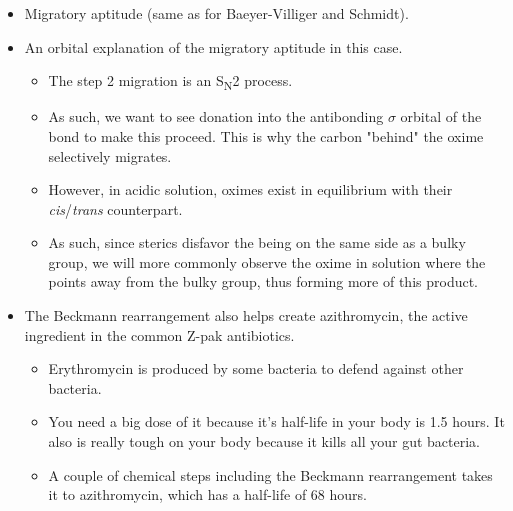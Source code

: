 \documentclass[../notes.tex]{subfiles}
\begin{document}
\begin{itemize}
    \item Migratory aptitude (same as for Baeyer-Villiger and Schmidt).
    \item An orbital explanation of the migratory aptitude in this case.
    \begin{itemize}
        \item The step 2 migration is an S\textsubscript{N}2 process.
        \item As such, we want to see donation into the antibonding $\sigma$ orbital of the  bond to make this proceed. This is why the carbon "behind" the oxime selectively migrates.
        \item However, in acidic solution, oximes exist in equilibrium with their \emph{cis}/\emph{trans} counterpart.
        \item As such, since sterics disfavor the  being on the same side as a bulky group, we will more commonly observe the oxime in solution where the  points away from the bulky group, thus forming more of this product.
    \end{itemize}
    \item The Beckmann rearrangement also helps create azithromycin, the active ingredient in the common Z-pak antibiotics.
    \begin{itemize}
        \item Erythromycin is produced by some bacteria to defend against other bacteria.
        \item You need a big dose of it because it's half-life in your body is 1.5 hours. It also is really tough on your body because it kills all your gut bacteria.
        \item A couple of chemical steps including the Beckmann rearrangement takes it to azithromycin, which has a half-life of 68 hours.
    \end{itemize}
\end{itemize}
\end{document}
